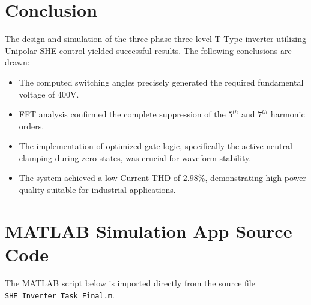 \documentclass[12pt, a4paper]{article}
\begin{document}
	\section{Conclusion}
	The design and simulation of the three-phase three-level T-Type inverter utilizing Unipolar SHE control yielded successful results. The following conclusions are drawn:
	\begin{itemize}
		\item The computed switching angles precisely generated the required fundamental voltage of $400\text{V}$.
		\item FFT analysis confirmed the complete suppression of the $5^{th}$ and $7^{th}$ harmonic orders.
		\item The implementation of optimized gate logic, specifically the active neutral clamping during zero states, was crucial for waveform stability.
		\item The system achieved a low Current THD of $2.98\%$, demonstrating high power quality suitable for industrial applications.
	\end{itemize}
	
	\newpage
	\appendix
	\section{MATLAB Simulation App Source Code}
	The MATLAB script below is imported directly from the source file \texttt{SHE\_Inverter\_Task\_Final.m}.
	
	
	
\end{document}
